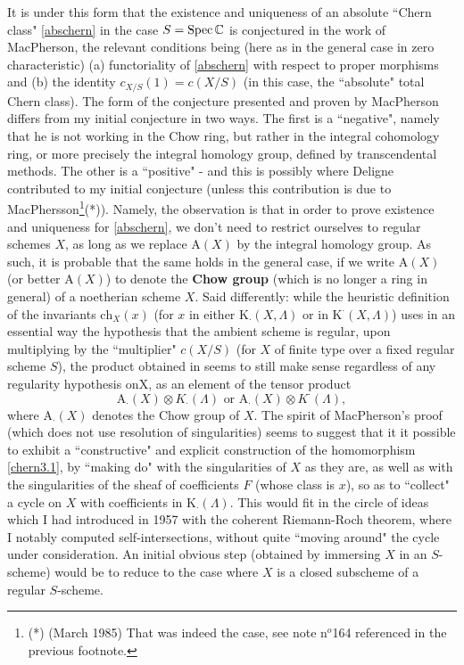 It is under this form that the existence and uniqueness of an absolute ``Chern class" \ref{abschern} in the case $S = \operatorname{Spec} \mathbb{C}$ is conjectured in the work of MacPherson, the relevant conditions being (here as in the general case in zero characteristic) (a) functoriality of \ref{abschern} with respect to proper morphisms and (b) the identity $c_{X/S}(1) = c(X/S)$ (in this case, the ``absolute" total Chern class). The form of the conjecture presented and proven by MacPherson differs from my initial conjecture in two ways. The first is a ``negative", namely that he is not working in the Chow ring, but rather in the integral cohomology ring, or more precisely the integral homology group, defined by transcendental methods. The other is a ``positive" - and this is possibly where Deligne contributed to my initial conjecture (unless this contribution is due to MacPhersson\footnote{(*) (March 1985) That was indeed the case, see note n$^o$164 referenced in the previous footnote.}(*)). Namely, the observation is that in order to prove existence and uniqueness for \ref{abschern}, we don't need to restrict ourselves to regular schemes $X$, as long as we replace $\text{A}(X)$ by the integral homology group. As such, it is probable that the same holds in the general case, if we write $\text{A}(X)$ (or better $\text{A}(X)$) to denote the \textbf{Chow group} (which is no longer a ring in general) of a noetherian scheme $X$. Said differently: while the heuristic definition of the invariants $\text{ch}_X(x)$ (for $x$ in either $\text{K}_\cdot(X, \Lambda)$ or in $\text{K}^\cdot(X, \Lambda)$) uses in an essential way the hypothesis that the ambient scheme is regular, upon multiplying by the ``multiplier" $c(X/S)$ (for $X$ of finite type over a fixed regular scheme $S$), the product obtained in \cite{relchern} seems to still make sense regardless of any regularity hypothesis onX, as an element of the tensor product 
$$ \text{A}_\cdot(X) \otimes K_\cdot(\Lambda) \text{  or } \text{A}_\cdot(X) \otimes K^\cdot(\Lambda),  $$
where $\text{A}_\cdot(X)$ denotes the Chow group of $X$. The spirit of MacPherson's proof (which does not use resolution of singularities) seems to suggest that it it possible to exhibit a ``constructive" and explicit construction of the homomorphism \ref{chern3.1}, by ``making do" with the singularities of $X$ as they are, as well as with the singularities of the sheaf of coefficients $F$ (whose class is $x$), so as to ``collect" a cycle on $X$ with coefficients in $\text{K}_\cdot(\Lambda)$. This would fit in the circle of ideas which I had introduced in 1957 with the coherent Riemann-Roch theorem, where I notably computed self-intersections, without quite ``moving around" the cycle under consideration. An initial obvious step (obtained by immersing $X$ in an $S$-scheme) would be to reduce to the case where $X$ is a closed subscheme of a regular $S$-scheme.


